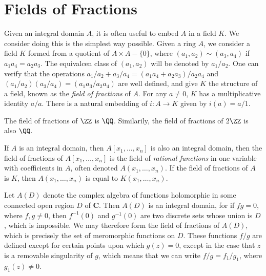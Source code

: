 \section{Fields of Fractions}

Given an integral domain $A$, it is often useful to embed $A$ in a field $K$. We consider doing this is the simplest way possible. Given a ring $A$, we consider a field $K$ formed from a quotient of $A \times A - \{ 0 \}$, where $(a_1,a_2) \sim (a_3,a_4)$ if $a_1a_4 = a_2a_3$. The equivalcen class of $(a_1,a_2)$ will be denoted by $a_1/a_2$. One can verify that the operations $a_1/a_2 + a_3/a_4 = (a_1a_4 + a_2a_3)/a_2a_4$ and $(a_1/a_2)(a_3/a_4) = (a_1a_3/a_2a_4)$ are well defined, and give $K$ the structure of a field, known as the \emph{field of fractions} of $A$. For any $a \neq 0$, $K$ has a multiplicative identity $a/a$. There is a natural embedding of $i: A \to K$ given by $i(a) = a/1$.

\begin{example}
    The field of fractions of $\ZZ$ is $\QQ$. Similarily, the field of fractions of $2\ZZ$ is also $\QQ$.
\end{example}

\begin{example}
    If $A$ is an integral domain, then $A[x_1,\dots,x_n]$ is also an integral domain, then the field of fractions of $A[x_1,\dots,x_n]$ is the field of \emph{rational functions} in one variable with coefficients in $A$, often denoted $A(x_1,\dots,x_n)$. If the field of fractions of $A$ is $K$, then $A(x_1,\dots,x_n)$ is equal to $K(x_1,\dots,x_n)$.
\end{example}

\begin{example}
    Let $A(D)$ denote the complex algebra of functions holomorphic in some connected open region $D$ of $\mathbf{C}$. Then $A(D)$ is an integral domain, for if $fg = 0$, where $f,g \neq 0$, then $f^{-1}(0)$ and $g^{-1}(0)$ are two discrete sets whose union is $D$, which is impossible. We may therefore form the field of fractions of $A(D)$, which is precisely the set of meromorphic functions on $D$. These functions $f/g$ are defined except for certain points upon which $g(z) = 0$, except in the case that $z$ is a removable singularity of $g$, which means that we can write $f/g = f_1/g_1$, where $g_1(z) \neq 0$.
\end{example}


